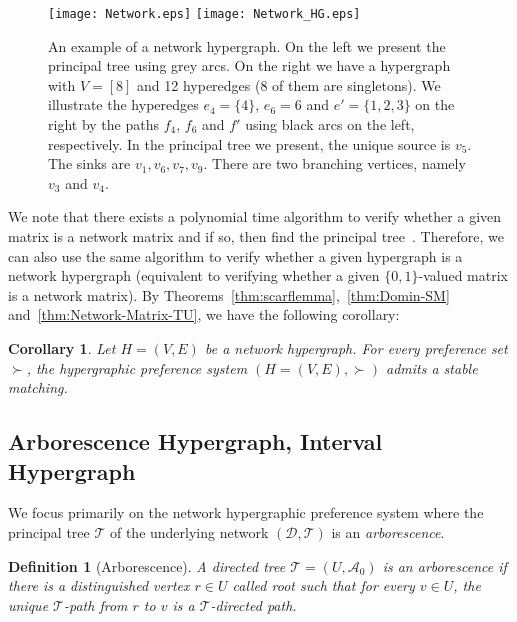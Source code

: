 \documentclass[11pt]{article}
\newtheorem{corollary}[theorem]{Corollary}
\newtheorem{definition}[theorem]{Definition}
\begin{document}
\begin{figure}[h!]
    \centering
    \texttt{[image: Network.eps]}
    \hspace{1cm}
    \texttt{[image: Network\_HG.eps]}
    \caption{An example of a network hypergraph. On the left we present the principal tree using grey arcs. On the right we have a hypergraph with $V=[8]$ and 12 hyperedges (8 of them are singletons). We illustrate the hyperedges $e_4=\{4\}$, $e_6={6}$ and $e'=\{1,2,3\}$ on the right by the paths $f_4$, $f_6$ and $f'$ using black arcs on the left, respectively. In the principal tree we present, the unique source is $v_5$. The sinks are $v_1,v_6,v_7,v_9$. There are two branching vertices, namely $v_3$ and $v_4$.
    }
    \label{fig:Network_HG}
\end{figure}

We note that there exists a polynomial time algorithm to verify whether a given matrix is a network matrix and if so, then find the principal tree~\cite{schrijver1998theory}. 
Therefore, we can also use the same algorithm to verify whether a given hypergraph is a network hypergraph (equivalent to verifying whether a given $\{0,1\}$-valued matrix is a network matrix). By Theorems~\ref{thm:scarflemma},~\ref{thm:Domin-SM} and~\ref{thm:Network-Matrix-TU}, we have the following corollary:

\begin{corollary}\label{cor:Exist-SM}
    Let $H=(V, E)$ be a network hypergraph. For every preference set $\succ$, the hypergraphic preference system $(H=(V,E),\succ)$ admits a stable matching.
\end{corollary}


\subsection{Arborescence Hypergraph, Interval Hypergraph}\label{sec:pre-arborescence}


We focus primarily on the network hypergraphic preference system where the principal tree $\mathcal{T}$ of the underlying network $(\mathcal{D},\mathcal{T})$ is an \emph{arborescence}.

\begin{definition}[Arborescence]\label{def:Arb}
    A directed tree $\mathcal{T}=(U,\mathcal{A}_0)$ is an \emph{arborescence} if there is a distinguished vertex $r\in U$ called \emph{root} such that for every $v\in U$, the unique $\mathcal{T}$-path from $r$ to $v$ is a $\mathcal{T}$-directed path.
\end{definition}
\end{document}
